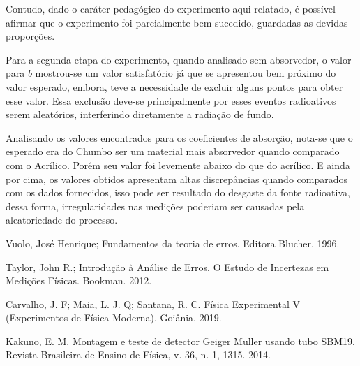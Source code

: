 \documentclass{article}
\begin{document}
Contudo, dado o caráter pedagógico do experimento aqui relatado, é possível afirmar que o experimento foi parcialmente bem sucedido, guardadas as devidas proporções.

Para a segunda etapa do experimento, quando analisado sem absorvedor, o valor para $b$ mostrou-se um valor satisfatório já que se apresentou bem próximo do valor esperado, embora, teve a necessidade de excluir alguns pontos para obter esse valor. Essa exclusão deve-se principalmente por esses eventos radioativos serem aleatórios, interferindo diretamente a radiação de fundo.

Analisando os valores encontrados para os coeficientes de absorção, nota-se que o esperado era do Chumbo ser um material mais absorvedor quando comparado com o Acrílico. Porém seu valor foi levemente abaixo do que do acrílico. E ainda por cima, os valores obtidos apresentam altas discrepâncias quando comparados com os dados fornecidos, isso pode ser resultado do desgaste da fonte radioativa, dessa forma, irregularidades nas medições
poderiam ser causadas pela aleatoriedade do processo.


\begin{thebibliography}{99}
    Vuolo, Jos{\'e} Henrique;
    Fundamentos da teoria de erros.
    Editora Blucher.
    1996.
    
    Taylor, John R.;
    Introdução à Análise de Erros. O Estudo de Incertezas em Medições Físicas.
    Bookman.
    2012.
    
    Carvalho, J. F; Maia, L. J. Q; Santana, R. C.
    Física Experimental V (Experimentos de Física Moderna).
    Goiânia, 2019.
    
    Kakuno, E. M.
    Montagem e teste de detector Geiger Muller usando tubo SBM19.
    Revista Brasileira de Ensino de Física, v. 36, n. 1, 1315.
    2014.
    
\end{thebibliography}
\end{document}
